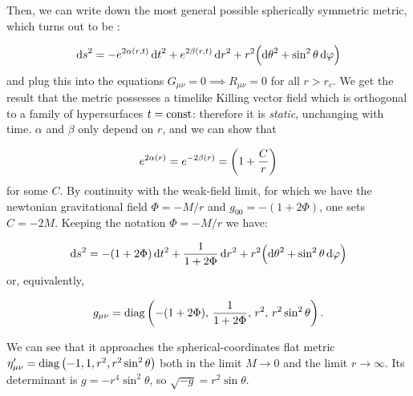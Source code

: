 \documentclass[main.tex]{subfiles}
\begin{document}
Then, we can write down the most general possible spherically symmetric metric, which turns out to be \cite[eq. 7.13]{Carroll:1997ar}:

\begin{equation}
  \dd{s} ^2 = -e^{2 \alpha(r, t)} \dd{t}^2 + e^{2 \beta(r, t)} \dd{r}^2
  + r^2 \qty(\dd{\theta}^2 + \sin^2\theta \dd{\varphi})
\end{equation}
and plug this into the equations \(G_{\mu\nu} = 0 \implies R_{\mu\nu} = 0 \) for all \(r>r_c\).
We get the result that the metric possesses a timelike Killing vector field which is orthogonal to a family of hypersurfaces \(t = \operatorname{const}\): therefore it is \emph{static}, unchanging with time.
\(\alpha\) and \(\beta\) only depend on \(r\), and we can show that

\begin{equation}
  e^{2 \alpha(r)} = e^{-2 \beta(r)} = \qty(1 + \frac{C}{r})
\end{equation}
for some \(C\). By continuity with the weak-field limit, for which we have the newtonian gravitational field \(\Phi = -M/r\) and \(g_{00} = - (1 + 2 \Phi)\), one sets \(C = -2M\).
Keeping the notation \(\Phi = -M/r\) we have:

\begin{equation}
    \dd{s}^2 = -(1+2\Phi)\dd{t}^2 + \frac{1}{1+2\Phi} \dd{r}^2
    + r^2 \qty(\dd{\theta}^2 + \sin^2\theta \dd{\varphi}) \label{eq:schwartzshild-line-element}
\end{equation}
or, equivalently,

\begin{equation}
    g_{\mu\nu} =  \diag\qty(-(1+2\Phi),\, \frac{1}{1+2\Phi},\, r^2,\, r^2 \sin ^2 \theta ) \,.
\end{equation}

We can see that it approaches the spherical-coordinates flat metric $\eta_{\mu\nu} ^{\prime} = \operatorname{diag}\qty(-1, 1, r^2, r^2 \sin ^2 \theta)$ both in the limit $M\rightarrow 0$ and the limit \(r \rightarrow \infty\). Its determinant is $g = -r^4 \sin^2 \theta$, so \(\sqrt{-g} = r^2 \sin \theta \).
\end{document}
